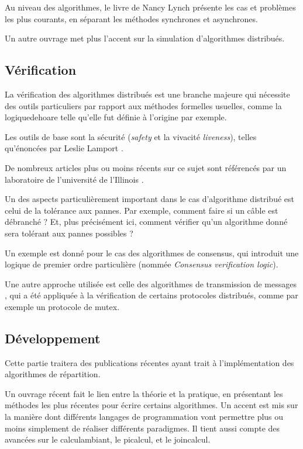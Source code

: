 Au niveau des algorithmes, le livre de Nancy Lynch \cite{lynch1996distributed} présente les cas et problèmes les plus courants, en séparant les méthodes synchrones et asynchrones. 

Un autre ouvrage \cite{attiya2004distributed} met plus l'accent sur la simulation d'algorithmes distribués.

\subsection{Vérification}
La vérification des algorithmes distribués est une branche majeure qui nécessite des outils particuliers par rapport aux méthodes formelles usuelles, comme la \gls{logiquedehoare} telle qu'elle fut définie à l'origine par exemple.

Les outils de base sont la sécurité (\textit{safety} et la vivacité \textit{liveness}), telles qu'énoncées par Leslie Lamport \cite{lamport1977proving}.

De nombreux articles plus ou moins récents sur ce sujet sont référencés par un laboratoire de l'université de l'Illinois \cite{formaldistributed}.

Un des aspects particulièrement important dans le cas d'algorithme distribué est celui de la tolérance aux pannes. Par exemple, comment faire si un câble est débranché ? Et, plus précisément ici, comment vérifier qu'un algorithme donné sera tolérant aux pannes possibles ? 

Un exemple est donné \cite{mcmillan2014verification} pour le cas des algorithmes de consensus, qui introduit une logique de premier ordre particulière (nommée \textit{Consensus verification logic}).

Une autre approche utilisée est celle des algorithmes de transmission de messages \cite{jezequel2014message}, qui a été appliquée à la vérification de certains protocoles distribués, comme par exemple un protocole de \gls{mutex}.

\subsection{Développement}
Cette partie traitera des publications récentes ayant trait à l'implémentation des algorithmes de répartition.

Un ouvrage récent \cite{varela2013programming} fait le lien entre la théorie et la pratique, en présentant les méthodes les plus récentes pour écrire certains algorithmes. Un accent est mis sur la manière dont différents langages de programmation vont permettre plus ou moins simplement de réaliser différents paradigmes. Il tient aussi compte des avancées sur le \gls{calculambiant}, le \gls{picalcul}, et le \gls{joincalcul}.

